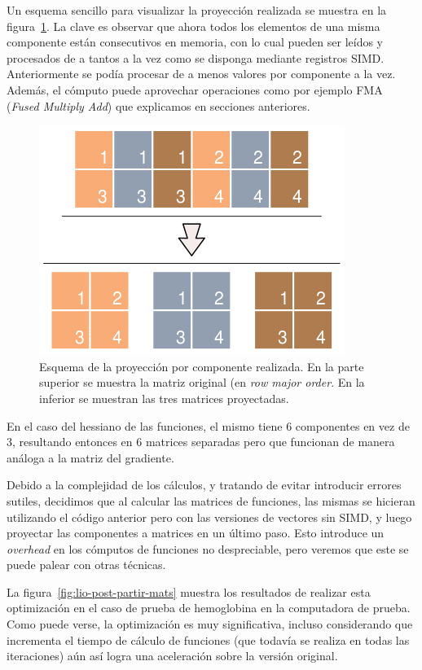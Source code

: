 Un esquema sencillo para visualizar la proyecci\'on realizada se muestra en
la figura~\ref{fig:matrix-split-img}. La clave es observar que ahora todos los
elementos de una misma componente est\'an consecutivos en memoria, con lo cual
pueden ser le\'idos y procesados de a tantos a la vez como se disponga mediante
registros SIMD. Anteriormente se pod\'ia procesar de a menos valores por
componente a la vez. Adem\'as, el c\'omputo puede aprovechar operaciones como
por ejemplo FMA (\textit{Fused Multiply Add}) que explicamos en secciones
anteriores.

\begin{figure}[htbp]
   \centering
   \includegraphics[width=\plotwidth]{images/matrix-split-img.png}
   \caption{Esquema de la proyecci\'on por componente realizada. En la parte
   superior se muestra la matriz original (en \textit{row major order}. En la
   inferior se muestran las tres matrices proyectadas.}
   \label{fig:matrix-split-img}
\end{figure}

En el caso del hessiano de las funciones, el mismo tiene 6 componentes en vez
de 3, resultando entonces en 6 matrices separadas pero que funcionan de manera
an\'aloga a la matriz del gradiente.

Debido a la complejidad de los c\'alculos, y tratando de evitar introducir
errores sutiles, decidimos que al calcular las matrices de funciones, las
mismas se hicieran utilizando el c\'odigo  anterior pero con las versiones de
vectores sin SIMD, y luego proyectar las componentes a matrices en un \'ultimo
paso. Esto introduce un \textit{overhead} en los c\'omputos de funciones no
despreciable, pero veremos que este se puede palear con otras t\'ecnicas.

La figura~\ref{fig:lio-post-partir-mats} muestra los resultados de realizar esta
optimizaci\'on en el caso de prueba de hemoglobina en la computadora de prueba.
Como puede verse, la optimizaci\'on es muy significativa, incluso considerando
que incrementa el tiempo de c\'alculo de funciones (que todav\'ia se realiza en
todas las iteraciones) a\'un as\'i logra una aceleraci\'on sobre la versi\'on
original.

